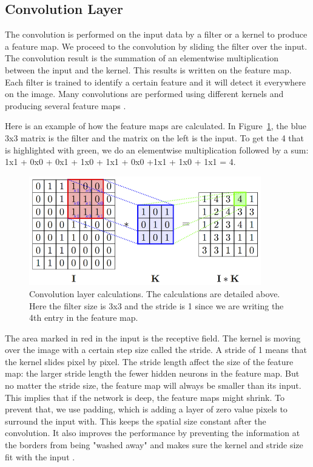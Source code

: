 \subsection{Convolution Layer}

The convolution is performed on the input data by a filter or a kernel to produce a feature map. We proceed to the convolution by sliding the filter over the input. The convolution result is the summation of an elementwise multiplication between the input and the kernel. This results is written on the feature map. Each filter is trained to identify a certain feature and it will detect it everywhere on the image.  Many convolutions are performed using different kernels and producing several feature maps \cite{nnbook}.

Here is an example of how the feature maps are calculated. In Figure~\ref{fig:convo_calc}, the blue 3x3 matrix is the filter and the matrix on the left is the input. To get the 4 that is highlighted with green, we do an elementwise multiplication followed by a sum: 1x1 + 0x0 + 0x1 + 1x0 + 1x1 + 0x0 +1x1 + 1x0 + 1x1 = 4. 
	\begin{figure}[!htp]
    \centering
        \includegraphics[width=0.9\textwidth]{figures/02-conv_layer}
        \caption[Convolution calculations]{Convolution layer calculations. The calculations are detailed above. Here the filter size is 3x3 and the stride is 1 since we are writing the 4th entry in the feature map.}\label{fig:convo_calc}
    \end{figure}
    
The area marked  in  red in the input is the receptive field. The kernel is moving over the image with a certain step size called the stride. A stride of 1 means that the kernel slides pixel by pixel. The stride length affect the size of the feature map: the larger stride length the fewer hidden neurons in the feature map. But no matter the stride size, the feature map will always be smaller than its input. This implies that if the network is deep, the feature maps might shrink. To prevent that, we use padding, which is adding a layer of zero value pixels to surround the input with. This keeps the spatial size constant after the convolution. It also improves the performance by preventing the information at the borders from being "washed away" and makes sure the kernel and stride size fit with the input \cite{cs231n}. 

